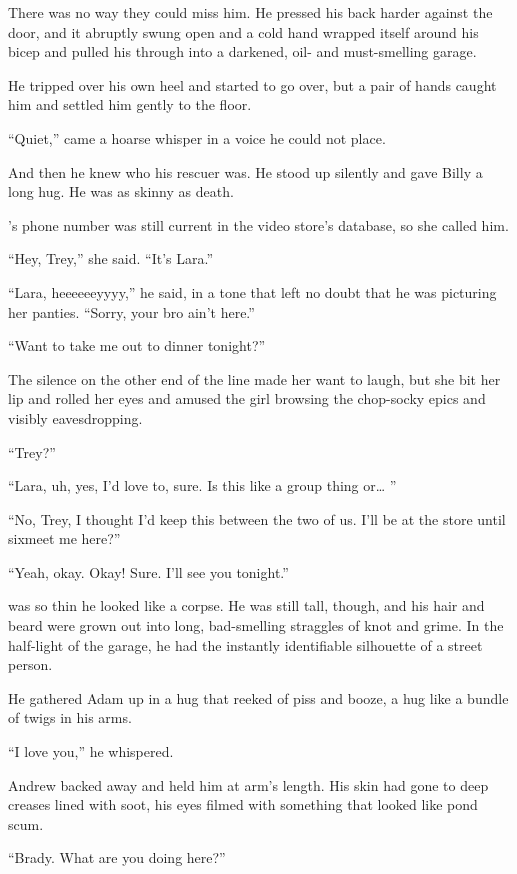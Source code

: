 There was no way they could miss him.  He pressed his back harder
against the door, and it abruptly swung open and a cold hand wrapped
itself around his bicep and pulled his through into a darkened, oil-
and must-smelling garage.

He tripped over his own heel and started to go over, but a pair of
hands caught him and settled him gently to the floor.

``Quiet,'' came a hoarse whisper in a voice he could not place.

And then he knew who his rescuer was.  He stood up silently and gave
Billy a long hug.  He was as skinny as death.

's phone number was still current in the video store's database,
so she called him.

``Hey, Trey,'' she said.  ``It's Lara.''

``Lara, heeeeeeyyyy,'' he said, in a tone that left no doubt that he
was picturing her panties.  ``Sorry, your bro ain't here.''

``Want to take me out to dinner tonight?''

The silence on the other end of the line made her want to laugh, but
she bit her lip and rolled her eyes and amused the girl browsing the
chop-socky epics and visibly eavesdropping.

``Trey?''

``Lara, uh, yes, I'd love to, sure.  Is this like a group thing or\ldots{} 
''

``No, Trey, I thought I'd keep this between the two of us.  I'll be at
the store until six\dash{}meet me here?''

``Yeah, okay.  Okay!  Sure.  I'll see you tonight.''

 was so thin he looked like a corpse.  He was still tall, though,
and his hair and beard were grown out into long, bad-smelling
straggles of knot and grime.  In the half-light of the garage, he had
the instantly identifiable silhouette of a street person.

He gathered Adam up in a hug that reeked of piss and booze, a hug like
a bundle of twigs in his arms.

``I love you,'' he whispered.

Andrew backed away and held him at arm's length.  His skin had gone to
deep creases lined with soot, his eyes filmed with something that
looked like pond scum.

``Brady.  What are you doing here?''

